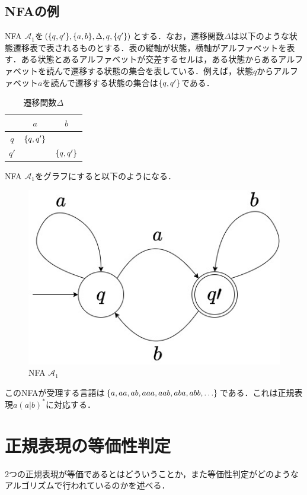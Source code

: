 \documentclass[a4paper, 12pt, dvipdfmx, uplatex]{jsreport}
\begin{document}
\subsection{NFAの例}
NFA $\mathcal{A}_1$を$(\qty{q,q'},\qty{a,b},\Delta,q,\qty{q'})$とする．なお，遷移関数$\Delta$は以下のような状態遷移表で表されるものとする．表の縦軸が状態，横軸がアルファベットを表す．ある状態とあるアルファベットが交差するセルは，ある状態からあるアルファベットを読んで遷移する状態の集合を表している．例えば，状態$q$からアルファベット$a$を読んで遷移する状態の集合は$\qty{q,q'}$である．

\begin{table}[H]
  \centering
  \caption{遷移関数$\Delta$\label{delta}}
  \begin{tabular}{c|c|c} \hline \hline
       & $a$  &$b$ \\\hline
    $q$  & $\qty{q,q'}$ &$\qty{}$ \\\hline
    $q'$ & $\qty{}$  &$\qty{q,q'}$ \\\hline
  \end{tabular}
\end{table}

NFA $\mathcal{A}_1$をグラフにすると以下のようになる．
\begin{figure}[H] %
  \centering
  \includegraphics[width=0.5\linewidth]{../figures/nfa.jpg}
  \caption{NFA $\mathcal{A}_1$\label{nfa_example}}
\end{figure}

このNFAが受理する言語は$\qty{a,aa,ab,aaa,aab,aba,abb,\ldots}$である．これは正規表現$a(a|b)^*$に対応する．


\section{正規表現の等価性判定}
2つの正規表現が等価であるとはどういうことか，また等価性判定がどのようなアルゴリズムで行われているのかを述べる．
\end{document}
